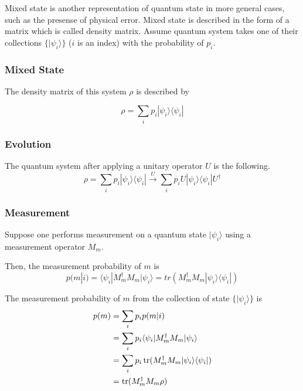  Mixed state is another representation of quantum state in more general cases, such as the presense of physical error.
Mixed state is described in the form of a matrix which is called density matrix.  Assume quantum system takes one of their collections $\{|\psi_i\rangle\}$ ($i$ is an index) with the probability of $p_i$.

\subsubsection{Mixed State}

The density matrix of this system $\rho$ is described by 

\begin{equation}
  \rho = \sum_i p_i |\psi_i\rangle\langle\psi_i|
\end{equation}

\subsubsection{Evolution}

The quantum system after applying a unitary operator $U$ is the following.
\begin{equation}
  \rho = \sum_i p_i |\psi_i\rangle\langle\psi_i| \xrightarrow{U} \sum_i p_i U|\psi_i\rangle\langle\psi_i|U^{\dagger}
\end{equation}

\subsubsection{Measurement}

Suppose one performs measurement on a quantum state $|\psi_i\rangle$ using a measurement operator $M_m$. 

Then, the measurement probability of $m$ is 
\begin{equation}
  p(m|i) = \langle\psi_i|M^{\dagger}_m M_m|\psi_i\rangle = tr(M^{\dagger}_m M_m|\psi_i\rangle\langle\psi_i|)
\end{equation}

The measurement probability of $m$ from the collection of state $\{|\psi_i\rangle\}$ is 
\begin{equation}
  \begin{split}
    p(m) &= \sum_i p_i p(m|i) \\ 
    &= \sum_i p_i \langle\psi_i|M^{\dagger}_m M_m|\psi_i\rangle \\
    &= \sum_i p_i \operatorname{tr}(M^{\dagger}_m M_m|\psi_i\rangle\langle\psi_i|) \\
    &= \operatorname{tr}(M^{\dagger}_m M_m \rho)
  \end{split}
\end{equation}

